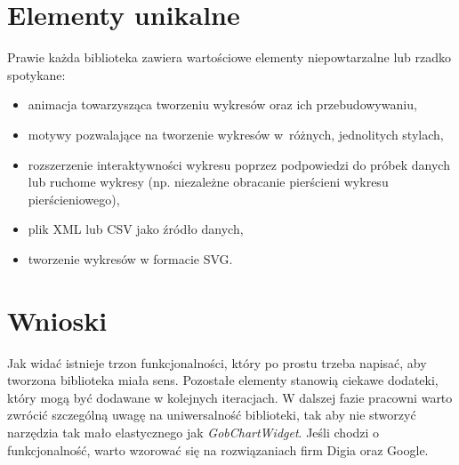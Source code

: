 \documentclass[11pt,twoside,a4paper,final]{llncs}
\begin{document}
\section{Elementy unikalne}
Prawie każda biblioteka zawiera wartościowe elementy niepowtarzalne lub rzadko spotykane:
\begin{itemize}
\item{animacja towarzysząca tworzeniu wykresów oraz ich przebudowywaniu,}
\item{motywy pozwalające na tworzenie wykresów w~różnych, jednolitych stylach,}
\item{rozszerzenie interaktywności wykresu poprzez podpowiedzi do próbek danych lub ruchome wykresy (np. niezależne obracanie pierścieni wykresu pierścieniowego),}
\item{plik XML lub CSV jako źródło danych,}
\item{tworzenie wykresów w formacie SVG.}
\end{itemize}

\section{Wnioski}
Jak widać istnieje trzon funkcjonalności, który po prostu trzeba napisać, aby tworzona biblioteka miała sens. Pozostałe elementy stanowią ciekawe dodateki, który mogą być dodawane w kolejnych iteracjach. W dalszej fazie pracowni warto zwrócić szczególną uwagę na uniwersalność biblioteki, tak aby nie stworzyć narzędzia tak mało elastycznego jak \textit{GobChartWidget}. Jeśli chodzi o funkcjonalność, warto wzorować się na rozwiązaniach firm Digia oraz Google.
\end{document}
